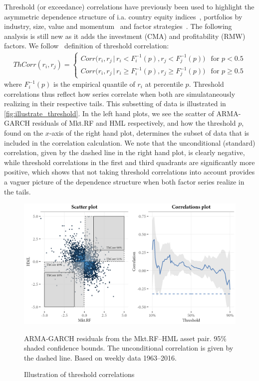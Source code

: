 Threshold (or exceedance) correlations have previously been used to highlight the asymmetric dependence structure of i.a. country equity indices~\autocite{LonginSolnik2001}, portfolios by industry, size, value and momentum~\autocite{AngChen2002} and factor strategies~\autocite{ChristoffersenLanglois2013}. The following analysis is still new as it adds the investment (CMA) and profitability (RMW) factors. We follow~\textcite{ChristoffersenLanglois2013} definition of threshold correlation:
\begin{align}
\label{eq:th_corr}
    ThCorr(r_i, r_j) = 
    \begin{cases} 
        Corr\Big(r_i, r_j \,|\, r_i < F_i^{-1}(p), r_j < F_j^{-1}(p)\Big)  & \text{for } p < 0.5 \\
        Corr\Big(r_i, r_j \,|\, r_i \geq F_i^{-1}(p), r_j \geq F_j^{-1}(p)\Big)  & \text{for } p \geq 0.5
    \end{cases}
\end{align}
where $F_i^{-1}(p)$ is the empirical quantile of $r_i$ at percentile $p$. Threshold correlations thus reflect how series correlate when both are simulataneously realizing in their respective tails. This subsetting of data is illustrated in \autoref{fig:illustrate_threshold}. In the left hand plots, we see the scatter of ARMA-GARCH residuals of Mkt.RF and HML respectively, and how the threshold $p$, found on the $x$-axis of the right hand plot, determines the subset of data that is included in the correlation calculation. We note that the unconditional (standard) correlation, given by the dashed line in the right hand plot, is clearly negative, while threshold correlations in the first and third quadrants are significantly more positive, which shows that not taking threshold correlations into account provides a vaguer picture of the dependence structure when both factor series realize in the tails.

\begin{figure}[H]
  \centering
  \includegraphics[scale=1]{graphics/threshold_explain_res.png}
  \footnotesize
  \caption{Illustration of threshold correlations}
  \begin{longcaption}
    ARMA-GARCH residuals from the Mkt.RF--HML asset pair. 95\% shaded confidence bounds. The unconditional correlation is given by the dashed line. Based on weekly data 1963--2016.
  \end{longcaption}
  \label{fig:illustrate_threshold}
\end{figure}

